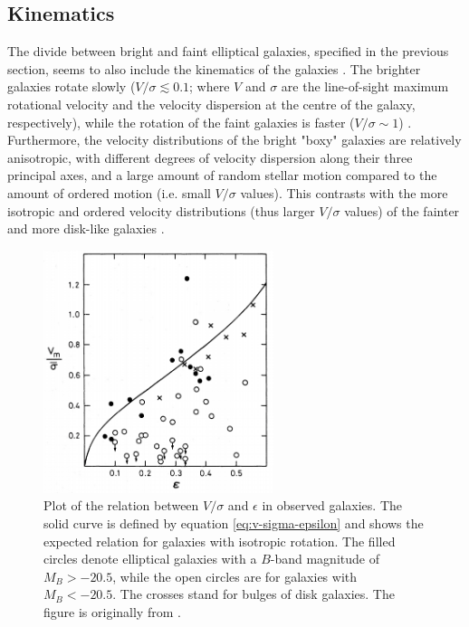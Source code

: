 \documentclass[english, twoside]{HYgradu}
\begin{document}
\subsection{Kinematics} \label{section:ellip_kinematics}

The divide between bright and faint elliptical galaxies, specified in the previous section, seems to also include the kinematics of the galaxies \citep[discussed in e.g.][]{GalaxyFormationAndEvo2010}. The brighter galaxies rotate slowly ($V/\sigma \lesssim 0.1$; where $V$ and $\sigma$ are the line-of-sight maximum rotational velocity and the velocity dispersion at the centre of the galaxy, respectively), while the rotation of the faint galaxies is faster ($V/\sigma \sim 1$) \citep{Davies1983, Cappellari2007}. Furthermore, the velocity distributions of the bright "boxy" galaxies are relatively anisotropic, with different degrees of velocity dispersion along their three principal axes, and a large amount of random stellar motion compared to the amount of ordered motion (i.e. small $V/\sigma$ values). This contrasts with the more isotropic and ordered velocity distributions (thus larger $V/\sigma$ values) of the fainter and more disk-like galaxies \citep{Kormendy2009, Krajnovic2008}. 

\begin{figure}[h]
	\centering
	\includegraphics[width=0.60\textwidth]{davies_v-sigma.png}
	\caption{Plot of the relation between $V/\sigma$ and $\epsilon$ in observed galaxies. The solid curve is defined by equation \ref{eq:v-sigma-epsilon} and shows the expected relation for galaxies with isotropic rotation. The filled circles denote elliptical galaxies with a $B$-band magnitude of $M_B > -20.5$, while the open circles are for galaxies with $M_B < -20.5$. The crosses stand for bulges of disk galaxies. The figure is originally from \cite{Davies1983}.}
	\label{figure:v-sigma}
\end{figure}
\end{document}
